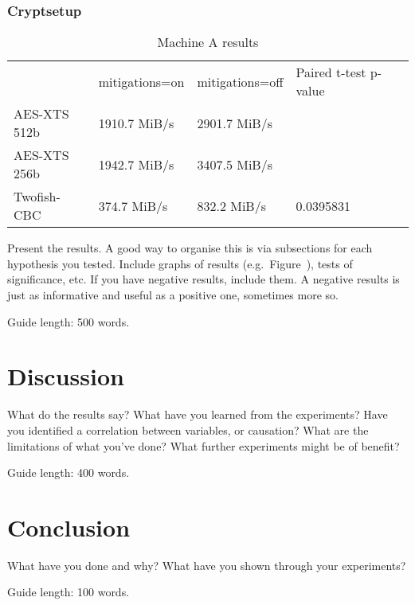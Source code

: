 \documentclass{csfourzero}
\begin{document}
\subsubsection{Cryptsetup}
\begin{table}[h]
\centering
\begin{tabular}{|l|l|l|l|l}
\cline{1-4}
             & mitigations=on & mitigations=off & Paired t-test p-value &  \\ \cline{1-4}
AES-XTS 512b & 1910.7 MiB/s   & 2901.7 MiB/s    &         &  \\ \cline{1-4}
AES-XTS 256b & 1942.7 MiB/s   & 3407.5 MiB/s    &         &  \\ \cline{1-4}
Twofish-CBC  & 374.7 MiB/s    & 832.2 MiB/s     & 0.0395831 &  \\ \cline{1-4}
\end{tabular}
\caption{Machine A results }
\label{tab:cryptoa}
\end{table}

Present the results. A good way to organise this is via subsections
for each hypothesis you tested. Include graphs of results
(e.g.\ Figure~), tests of significance, etc. If you have
negative results, include them. A negative results is just as
informative and useful as a positive one, sometimes more so.


Guide length: 500 words.

\section{Discussion}
\label{sec:discuss}

What do the results say? What have you learned from the
experiments? Have you identified a correlation between variables, or
causation? What are the limitations of what you've done? What further
experiments might be of benefit?

Guide length: 400 words.

\section{Conclusion}
\label{sec:conc}

What have you done and why? What have you shown through your
experiments?

Guide length: 100 words.


\end{document}
